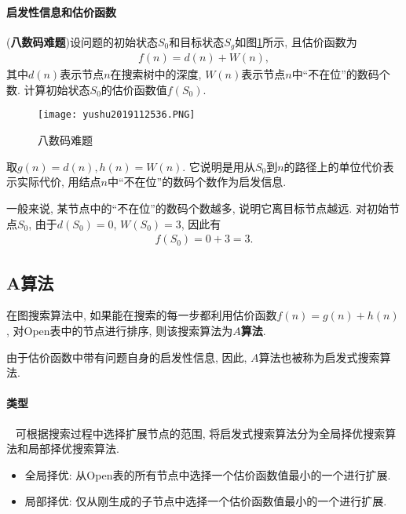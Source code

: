 \paragraph{启发性信息和估价函数}
\begin{example}\label{AI32C4exam08}
(\textbf{八数码难题})设问题的初始状态$S_0$和目标状态$S_g$如图\ref{AI32fig2019120134}所示, 且估价函数为
\begin{align}
  f(n)=d(n)+W(n),
\end{align}
其中$d(n)$表示节点$n$在搜索树中的深度, $W(n)$表示节点$n$中“不在位”的数码个数. 计算初始状态$S_0$的估价函数值$f(S_0)$.
\end{example}
\begin{figure}[H]
\centering
\texttt{[image: yushu2019112536.PNG]}
\caption{八数码难题}
\label{AI32fig2019120134}
\end{figure}
\begin{result}
取$g(n)=d(n),h(n)=W(n)$. 它说明是用从$S_0$到$n$的路径上的单位代价表示实际代价, 用结点$n$中“不在位”的数码个数作为启发信息.

一般来说, 某节点中的“不在位”的数码个数越多, 说明它离目标节点越远.
对初始节点$S_0$, 由于$d(S_0)=0$, $W(S_0)=3$, 因此有
\begin{align}
  f(S_0)=0+3=3.
\end{align}
\end{result}
\subsection{A算法}
在图搜索算法中, 如果能在搜索的每一步都利用估价函数$f(n)=g(n)+h(n)$, 对Open表中的节点进行排序, 则该搜索算法为\textbf{$A$算法}.
\begin{remark}
  由于估价函数中带有问题自身的启发性信息, 因此, $A$算法也被称为启发式搜索算法.
\end{remark}
\paragraph{类型}~{}
可根据搜索过程中选择扩展节点的范围, 将启发式搜索算法分为全局择优搜索算法和局部择优搜索算法.
\begin{itemize}
	\item \textcolor[rgb]{0,0,1}{全局择优}:  从Open表的所有节点中选择一个估价函数值最小的一个进行扩展.
	\item \textcolor[rgb]{0,0,1}{局部择优}: 仅从刚生成的子节点中选择一个估价函数值最小的一个进行扩展.
\end{itemize}

